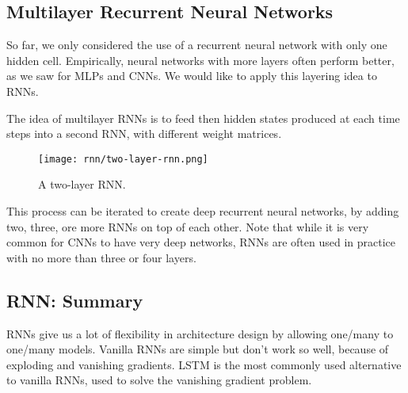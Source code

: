 \subsection{Multilayer Recurrent Neural Networks}
So far, we only considered the use of a recurrent neural network with only one hidden cell. Empirically, neural networks with more layers often perform better, as we saw for MLPs and CNNs. We would like to apply this layering idea to RNNs.

The idea of multilayer RNNs is to feed then hidden states produced at each time steps into a second RNN, with different weight matrices.
\begin{figure}[H]
    \centering
    \texttt{[image: rnn/two-layer-rnn.png]}
    \caption{A two-layer RNN.}
\end{figure}
This process can be iterated to create deep recurrent neural networks, by adding two, three, ore more RNNs on top of each other. Note that while it is very common for CNNs to have very deep networks, RNNs are often used in practice with no more than three or four layers.

\subsection*{RNN: Summary}
RNNs give us a lot of flexibility in architecture design by allowing one/many to one/many models. Vanilla RNNs are simple but don't work so well, because of exploding and vanishing gradients. LSTM is the most commonly used alternative to vanilla RNNs, used to solve the vanishing gradient problem.


